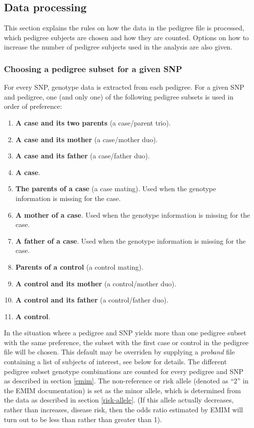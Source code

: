 \documentclass[a4paper,12pt]{article}
\begin{document}

\subsection{Data processing}
\label{premim-processing}

This section explains the rules on how the data in the pedigree file is processed, which pedigree subjects are chosen and how they are counted. Options on how to increase the number of pedigree subjects used in the analysis are also given. 
\subsubsection{Choosing a pedigree subset for a given SNP}
\label{premim-ped-subset}

For every SNP, genotype data is extracted from each pedigree. For a given SNP and pedigree, one (and only one) of the following pedigree subsets is used in order of preference: 
\begin{enumerate}

\item {\bf A case and its two parents} (a case/parent trio). 
\item {\bf A case and its mother} (a case/mother duo). 
\item {\bf A case and its father} (a case/father duo). 
\item {\bf A case}. 
\item {\bf The parents of a case} (a case mating). Used when the genotype information is missing for the case. 
\item {\bf A mother of a case}. Used when the genotype information is missing for the case. 
\item {\bf A father of a case}. Used when the genotype information is missing for the case. 
\item {\bf Parents of a control} (a control mating). 
\item {\bf A control and its mother} (a control/mother duo). 
\item {\bf A control and its father} (a control/father duo). 
\item {\bf A control}.\end{enumerate}

In the situation where a pedigree and SNP yields more than one pedigree subset with the same preference, the subset with the first case or control in the pedigree file will be chosen. This default may be overriden by supplying a {\it proband} file containing a list of subjects of interest, see below for details. The different pedigree subset genotype combinations are counted for every pedigree and SNP as described in  section \ref{emim}. The non-reference or risk allele (denoted as ``2'' in the EMIM documentation) is set as the minor allele, which is determined from the data as described in  section \ref{risk-allele}. (If this allele actually decreases, rather than increases, disease risk, then the odds ratio estimated by EMIM will turn out to be less than rather than greater than 1). 
\end{document}
